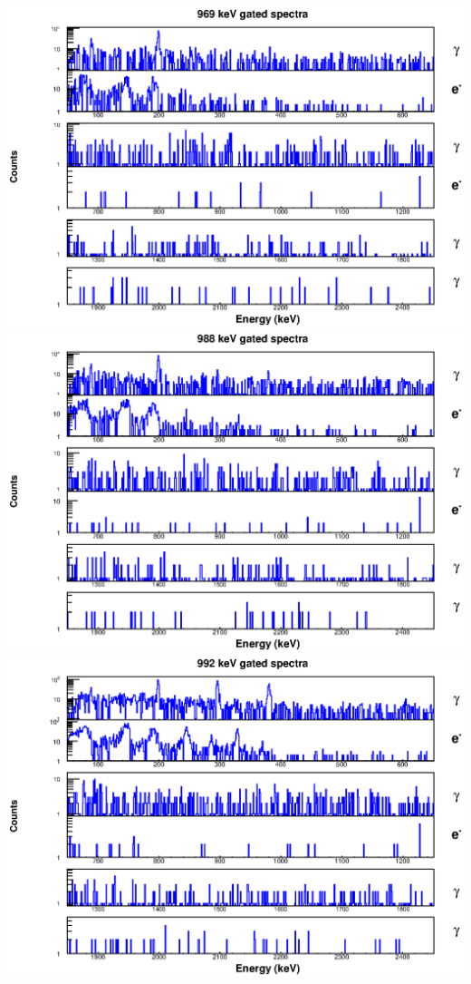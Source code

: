 \begin{landscape}
\includegraphics[scale=1.1]{156Gd_Appendix/969_combined.eps}
\includegraphics[scale=1.1]{156Gd_Appendix/988_combined.eps}
\includegraphics[scale=1.1]{156Gd_Appendix/992_combined.eps}

\end{landscape}

